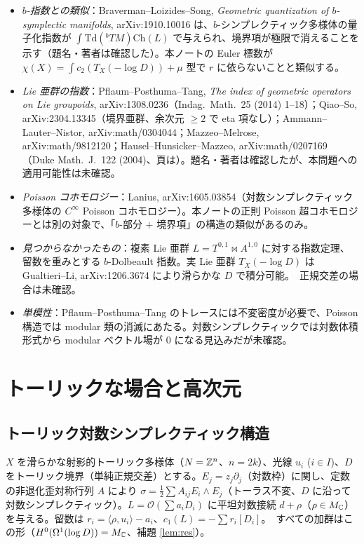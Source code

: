 \begin{rem}[\tC\ 文献の状況と障害]
\begin{itemize}
\item \emph{$b$-指数との類似}：Braverman--Loizides--Song, \emph{Geometric quantization of $b$-symplectic manifolds}, arXiv:1910.10016 は、$b$-シンプレクティック多様体の量子化指数が $\int\mathrm{Td}({}^bTM)\mathrm{Ch}(L)$ で与えられ、境界項が極限で消えることを示す（題名・著者は確認した\tC）。本ノートの Euler 標数が $\chi(X)=\int c_2(T_X(-\log D))+\mu$ 型で $r$ に依らないことと類似する。
\item \emph{Lie 亜群の指数}：Pflaum--Posthuma--Tang, \emph{The index of geometric operators on Lie groupoids}, arXiv:1308.0236（Indag.\ Math.\ 25 (2014) 1--18）；Qiao--So, arXiv:2304.13345（境界亜群、余次元 $\ge2$ で eta 項なし）；Ammann--Lauter--Nistor, arXiv:math/0304044；Mazzeo--Melrose, arXiv:math/9812120；Hausel--Hunsicker--Mazzeo, arXiv:math/0207169（Duke Math.\ J.\ 122 (2004)、頁は\tQ）。題名・著者は確認したが、本問題への適用可能性は未確認。
\item \emph{Poisson コホモロジー}：Lanius, arXiv:1605.03854（対数シンプレクティック多様体の $C^\infty$ Poisson コホモロジー）。本ノートの正則 Poisson 超コホモロジーとは別の対象で、「$b$-部分 $+$ 境界項」の構造の類似があるのみ。
\item \emph{見つからなかったもの}：複素 Lie 亜群 $L=T^{0,1}\bowtie A^{1,0}$ に対する指数定理、留数を重みとする $b$-Dolbeault 指数。実 Lie 亜群 $T_X(-\log D)$ は Gualtieri--Li, arXiv:1206.3674 により滑らかな $D$ で積分可能。\tC\ 正規交差の場合は未確認。
\item \emph{単模性}：Pflaum--Posthuma--Tang のトレースには不変密度が必要で、Poisson 構造では modular 類の消滅にあたる。対数シンプレクティックでは対数体積形式から modular ベクトル場が 0 になる見込みだが未確認\tQ。
\end{itemize}
\end{rem}

\section{トーリックな場合と高次元}\label{sec:toric}
\subsection{トーリック対数シンプレクティック構造}
$X$ を滑らかな射影的トーリック多様体（$N=\mathbb Z^n$、$n=2k$）、光線 $u_i$ ($i\in I$)、$D$ をトーリック境界（単純正規交差）とする。$E_j=z_j\partial_j$（対数枠）に関し、定数の非退化歪対称行列 $A$ により $\sigma=\tfrac12\sum A_{ij}E_i\wedge E_j$（トーラス不変、$D$ に沿って対数シンプレクティック）。$L=\mathcal O(\sum a_iD_i)$ に平坦対数接続 $d+\rho$（$\rho\in M_\mathbb C$）を与える。留数は $r_i=\langle\rho,u_i\rangle-a_i$、$c_1(L)=-\sum r_i[D_i]$。\tP\ すべての加群はこの形（$H^0(\Omega^1(\log D))=M_\mathbb C$、補題 \ref{lem:res}）。

